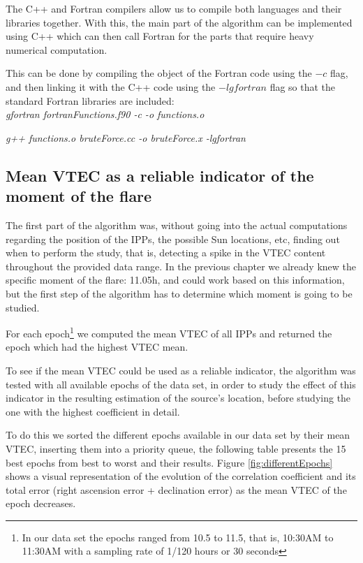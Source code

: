The C++ and Fortran compilers allow us to compile both languages and their libraries together. With this, the main part of the algorithm can be implemented using C++ which can then call Fortran for the parts that require heavy numerical computation.

This can be done by compiling the object of the Fortran code using the $-c$ flag, and then linking it with the C++ code using the $-lgfortran$ flag so that the standard Fortran libraries are included: \\

\textit{gfortran fortranFunctions.f90 -c -o functions.o}
	
\textit{g++ functions.o bruteForce.cc -o bruteForce.x -lgfortran}

\subsection{Mean VTEC as a reliable indicator of the moment of the flare}

The first part of the algorithm was, without going into the actual computations regarding the position of the IPPs, the possible Sun locations, etc, finding out when to perform the study, that is, detecting a spike in the VTEC content throughout the provided data range. 
In the previous chapter we already knew the specific moment of the flare: 11.05h, and could work based on this information, but the first step of the algorithm has to determine which moment is going to be studied.

For each epoch\footnote{In our data set the epochs ranged from 10.5 to 11.5, that is, 10:30AM to 11:30AM with a sampling rate of 1/120 hours or 30 seconds} we computed the mean VTEC of all IPPs and returned the epoch which had the highest VTEC mean.

To see if the mean VTEC could be used as a reliable indicator, the algorithm was tested with all available epochs of the data set, in order to study the effect of this indicator in the resulting estimation of the source's location, before studying the one with the highest coefficient in detail.

To do this we sorted the different epochs available in our data set by their mean VTEC, inserting them into a priority queue, the following table presents the 15 best epochs from best to worst and their results. Figure \ref{fig:differentEpochs} shows a visual representation of the evolution of the correlation coefficient and its total error (right ascension error + declination error) as the mean VTEC of the epoch decreases.

